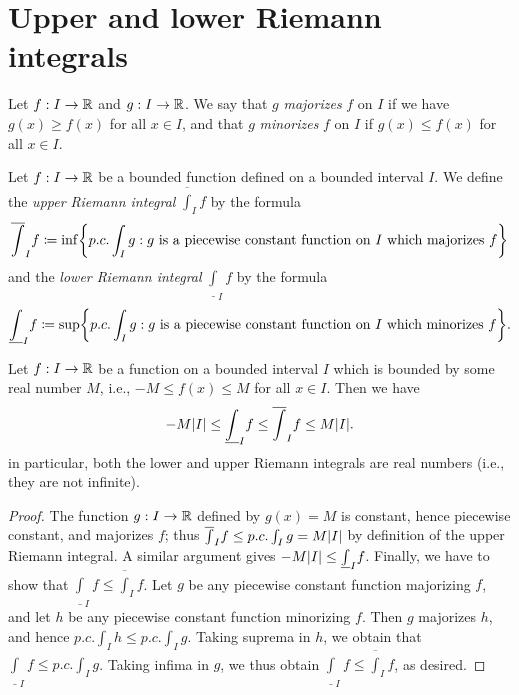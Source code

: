 \section{Upper and lower Riemann integrals}\label{i:sec:11.3}

\begin{defn}\label{i:11.3.1}
  Let \(f : I \to \mathbb{R}\) and \(g : I \to \mathbb{R}\).
  We say that \(g\) \emph{majorizes} \(f\) on \(I\) if we have \(g(x) \geq f(x)\) for all \(x \in I\), and that \(g\) \emph{minorizes} \(f\) on \(I\) if \(g(x) \leq f(x)\) for all \(x \in I\).
\end{defn}

\begin{defn}\label{i:11.3.2}
  Let \(f : I \to \mathbb{R}\) be a bounded function defined on a bounded interval \(I\).
  We define the \emph{upper Riemann integral} \(\overline{\int}_I f\) by the formula
  \[
    \overline{\int}_I f \coloneqq \inf\set{p.c. \int_I g : g \text{ is a piecewise constant function on \(I\) which majorizes } f}
  \]
  and the \emph{lower Riemann integral} \(\underline{\int}_I f\) by the formula
  \[
    \underline{\int}_I f \coloneqq \sup\set{p.c. \int_I g : g \text{ is a piecewise constant function on \(I\) which minorizes } f}.
  \]
\end{defn}

\begin{lem}\label{i:11.3.3}
  Let \(f : I \to \mathbb{R}\) be a function on a bounded interval \(I\) which is bounded by some real number \(M\), i.e., \(-M \leq f(x) \leq M\) for all \(x \in I\).
  Then we have
  \[
    -M \abs{I} \leq \underline{\int}_I f \leq \overline{\int}_I f \leq M \abs{I}.
  \]
  in particular, both the lower and upper Riemann integrals are real numbers (i.e., they are not infinite).
\end{lem}

\begin{proof}
  The function \(g : I \to \mathbb{R}\) defined by \(g(x) = M\) is constant, hence piecewise constant, and majorizes \(f\);
  thus \(\overline{\int}_I f \leq p.c. \int_I g = M \abs{I}\) by definition of the upper Riemann integral.
  A similar argument gives \(-M \abs{I} \leq \underline{\int}_I f\).
  Finally, we have to show that \(\underline{\int}_I f \leq \overline{\int}_I f\).
  Let \(g\) be any piecewise constant function majorizing \(f\), and let \(h\) be any piecewise constant function minorizing \(f\).
  Then \(g\) majorizes \(h\), and hence \(p.c. \int_I h \leq p.c. \int_I g\).
  Taking suprema in \(h\), we obtain that \(\underline{\int}_I f \leq p.c. \int_I g\).
  Taking infima in \(g\), we thus obtain \(\underline{\int}_I f \leq \overline{\int}_I f\), as desired.
\end{proof}

